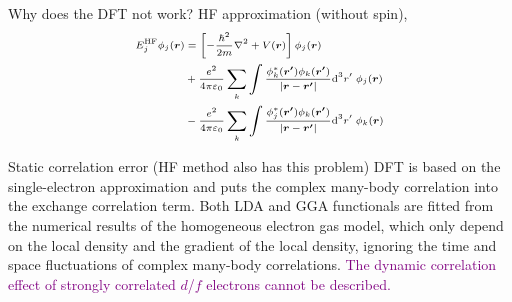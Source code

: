 \documentclass{beamer}
\newcommand{\purple}{\textcolor{purple}}
\begin{document}
  \begin{frame}{Why does the DFT not work?}
    HF approximation (without spin),
    \begin{equation*}\scriptsize
      \begin{aligned}
        E^{\text{HF}}_j\phi_j(\bm{r}) &= \left[-\frac{\hbar^2}{2m}\nabla^2+V(\bm{r})\right]\phi_j(\bm{r}) \\
        &+ \frac{e^2}{4\pi{}\varepsilon_0}\sum_k\int\frac{\phi_k^*(\bm{r'})\phi_k(\bm{r'})}{|\bm{r}-\bm{r'}|}\mathrm{d}^3r'\; \phi_j(\bm{r}) \\
        &- \frac{e^2}{4\pi{}\varepsilon_0}\sum_k\int\frac{\phi_j^*(\bm{r'})\phi_k(\bm{r'})}{|\bm{r}-\bm{r'}|}\mathrm{d}^3r'\; \phi_k(\bm{r})
      \end{aligned}
    \end{equation*}

    \begin{block}{Static correlation error (HF method also has this problem)}
      DFT is based on the single-electron approximation and puts the complex many-body correlation into the exchange correlation term. Both LDA and GGA functionals are fitted from the numerical results of the homogeneous electron gas model, which only depend on the local density and the gradient of the local density, ignoring the time and space fluctuations of complex many-body correlations. \purple{The dynamic correlation effect of strongly correlated \(d\)/\(f\) electrons cannot be described.}
    \end{block}
  \end{frame}
\end{document}
